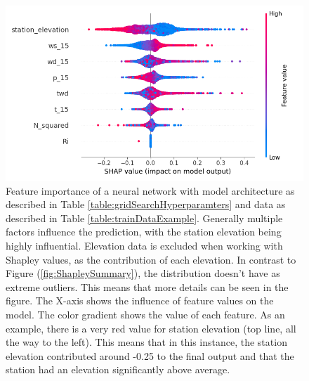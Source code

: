 \begin{figure}
    \centering
    \includegraphics[scale = 0.6]{Figures/shap_plots/summary_plot_190924_.png}
    \caption[Summary feature importance of a neural network using a larger distribution of data.]{Feature importance of a neural network with model architecture as described in Table \ref{table:gridSearchHyperparamters} and data as described in Table \ref{table:trainDataExample}. Generally multiple factors influence the prediction, with the station elevation being highly influential. Elevation data is excluded when working with Shapley values, as the contribution of each elevation. In contrast to Figure (\ref{fig:ShapleySummary}), the distribution doesn't have as extreme outliers. This means that more details can be seen in the figure. The X-axis shows the influence of feature values on the model. The color gradient shows the value of each feature. As an example, there is a very red value for station elevation (top line, all the way to the left). This means that in this instance, the station elevation contributed around -0.25 to the final output and that the station had an elevation significantly above average.}
    \label{fig:ShapleySummary2}
\end{figure}

